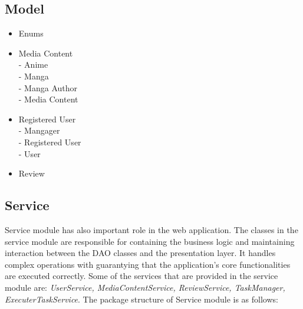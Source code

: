 \subsection*{Model}
\begin{itemize}
    \item Enums
    \item Media Content \\
    - Anime\\
    - Manga \\
    - Manga Author \\
    - Media Content
    \item Registered User\\
    - Mangager\\
    - Registered User\\
    - User
    \item Review 
\end{itemize}

\subsection*{Service}
Service module has also important role in the web application. The classes in the service module are responsible for containing
the business logic and maintaining interaction between the DAO classes and the presentation layer. 
It handles complex operations with guarantying that the application's core functionalities are executed correctly. Some of the services
that are provided in the service module are: \textit{UserService, MediaContentService, ReviewService, TaskManager, ExecuterTaskService}. The 
package structure of Service module is as follows:





